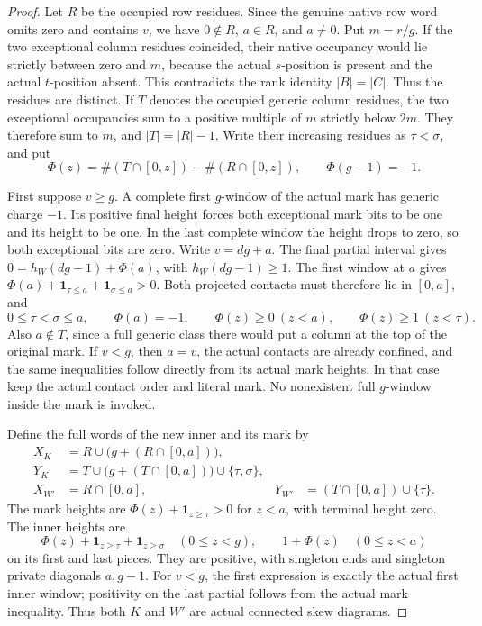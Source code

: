 \documentclass[11pt,a4paper]{amsart}
\numberwithin{equation}{section}
\theoremstyle{plain}
\theoremstyle{definition}
\begin{document}
\begin{proof}
Let \(R\) be the occupied row residues.  Since the genuine native
row word omits zero and contains \(v\), we have \(0\notin R\),
\(a\in R\), and \(a\ne0\).  Put \(m=r/g\).  If the two
exceptional column residues coincided, their native occupancy would lie
strictly between zero and \(m\), because the actual \(s\)-position
is present and the actual \(t\)-position absent.  This contradicts the
rank identity \(|B|=|C|\).  Thus the residues are distinct.  If
\(T\) denotes the occupied generic column residues, the two exceptional
occupancies sum to a positive multiple of \(m\) strictly below \(2m\).
They therefore sum to \(m\), and \(|T|=|R|-1\).
Write their increasing residues as \(\tau<\sigma\), and put
\[
 \Phi(z)=\#(T\cap[0,z])-\#(R\cap[0,z]),\qquad
 \Phi(g-1)=-1.
\]

First suppose \(v\ge g\).  A complete first \(g\)-window of
the actual mark has generic charge \(-1\).  Its positive final height
forces both exceptional mark bits to be one and its height to be one.
In the last complete window the height drops to zero, so both exceptional
bits are zero.  Write \(v=dg+a\).  The final partial interval gives
\(0=h_W(dg-1)+\Phi(a)\), with \(h_W(dg-1)\ge1\).
The first window at \(a\) gives
\(\Phi(a)+\mathbf1_{\tau\le a}+\mathbf1_{\sigma\le a}>0\).
Both projected contacts must therefore lie in \([0,a]\), and
\[
 0\le\tau<\sigma\le a,\qquad
 \Phi(a)=-1,\qquad \Phi(z)\ge0\ (z<a),\qquad
 \Phi(z)\ge1\ (z<\tau).
\]
Also \(a\notin T\), since a full generic class there would put
a column at the top of the original mark.  If \(v<g\), then
\(a=v\), the actual contacts are already confined, and the same
inequalities follow directly from its actual mark heights.  In that
case keep the actual contact order and literal mark.  No nonexistent
full \(g\)-window inside the mark is invoked.

Define the full words of the new inner and its mark by
\begin{align*}
 X_K&=R\cup\bigl(g+(R\cap[0,a])\bigr),\\
 Y_K&=T\cup\bigl(g+(T\cap[0,a])\bigr)\cup\{\tau,\sigma\},\\
 X_{W'}&=R\cap[0,a],&
 Y_{W'}&=(T\cap[0,a])\cup\{\tau\}.
\end{align*}
The mark heights are \(\Phi(z)+\mathbf1_{z\ge\tau}>0\) for
\(z<a\), with terminal height zero.  The inner heights are
\[
 \Phi(z)+\mathbf1_{z\ge\tau}+\mathbf1_{z\ge\sigma}\quad(0\le z<g),
 \qquad 1+\Phi(z)\quad(0\le z<a)
\]
on its first and last pieces.  They are positive, with singleton ends
and singleton private diagonals \(a,g-1\).  For \(v<g\), the
first expression is exactly the actual first inner window; positivity
on the last partial follows from the actual mark inequality.  Thus both
\(K\) and \(W'\) are actual connected skew diagrams.


\end{proof}
\end{document}
